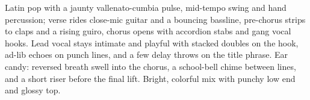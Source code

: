 

\begin{notes}
\end{notes}
\begin{style}
Latin pop with a jaunty vallenato-cumbia pulse, mid-tempo swing and hand percussion; verse rides close-mic guitar and a bouncing bassline, pre-chorus strips to claps and a rising guiro, chorus opens with accordion stabs and gang vocal hooks. %
Lead vocal stays intimate and playful with stacked doubles on the hook, ad-lib echoes on punch lines, and a few delay throws on the title phrase. %
Ear candy: reversed breath swell into the chorus, a school-bell chime between lines, and a short riser before the final lift. %
Bright, colorful mix with punchy low end and glossy top.
\end{style}
